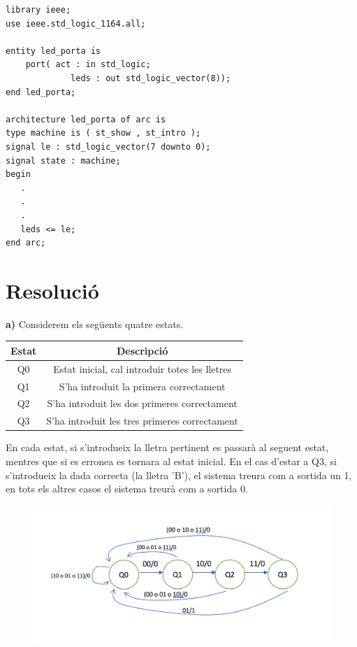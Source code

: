 \documentclass[12pt, a4papre]{article}
\begin{document}
	\begin{lstlisting}[style=vhdl, frame=single, basicstyle=\small]
library ieee;
use ieee.std_logic_1164.all;

entity led_porta is
    port( act : in std_logic;  
             leds : out std_logic_vector(8));
end led_porta;

architecture led_porta of arc is
type machine is ( st_show , st_intro );
signal le : std_logic_vector(7 downto 0);
signal state : machine;
begin
   .
   .
   .
   leds <= le;
end arc;
	\end{lstlisting}
	
	\newpage
	
	\section{Resolució} 
	
	\textbf{a)} Considerem els següents quatre estats.
	
	\begin{table}[h!]
		\centering
		 \begin{tabular}{|c | c|} 
			 \hline
			 Estat & Descripció\\ [0.5ex] 
			 \hline\hline
			  Q0 &  Estat inicial, cal introduir totes les lletres\\ 
			  \hline
			  Q1 &  S'ha introduit la primera correctament\\ 
			 \hline
			 Q2 & S'ha introduit les dos primeres correctament\\ [0.5ex] 
			 \hline
			 Q3 & S'ha introduit les tres primeres correctament\\ 
			 \hline
		 \end{tabular}
	\end{table}
	
	En cada estat, si s'introdueix la lletra pertinent es passarà al seguent estat, mentres que si es erronea es tornara al estat inicial. En el cas d'estar a Q3, si s'introdueix la dada correcta (la lletra 'B'), el sistema treura com a sortida un 1, en tots els altres casos el sistema treurà com a sortida 0.
	
	\begin{figure}[H]
		\begin{center}
		\includegraphics[width=130mm]{ApartatA.png}
		\end{center}
	\end{figure}
	
\end{document}
